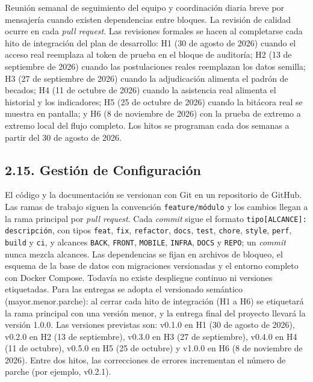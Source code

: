 Reunión semanal de seguimiento del equipo y coordinación diaria breve por mensajería cuando existen dependencias entre bloques. La revisión de calidad ocurre en cada \textit{pull request}. Las revisiones formales se hacen al completarse cada hito de integración del plan de desarrollo: H1 (30 de agosto de 2026) cuando el acceso real reemplaza al token de prueba en el bloque de auditoría; H2 (13 de septiembre de 2026) cuando las postulaciones reales reemplazan los datos semilla; H3 (27 de septiembre de 2026) cuando la adjudicación alimenta el padrón de becados; H4 (11 de octubre de 2026) cuando la asistencia real alimenta el historial y los indicadores; H5 (25 de octubre de 2026) cuando la bitácora real se muestra en pantalla; y H6 (8 de noviembre de 2026) con la prueba de extremo a extremo local del flujo completo. Los hitos se programan cada dos semanas a partir del 30 de agosto de 2026.

\subsection{2.15. Gestión de Configuración}

El código y la documentación se versionan con Git en un repositorio de GitHub. Las ramas de trabajo siguen la convención \texttt{feature/m\'odulo} y los cambios llegan a la rama principal por \textit{pull request}. Cada \textit{commit} sigue el formato \texttt{tipo[ALCANCE]: descripción}, con tipos \texttt{feat}, \texttt{fix}, \texttt{refactor}, \texttt{docs}, \texttt{test}, \texttt{chore}, \texttt{style}, \texttt{perf}, \texttt{build} y \texttt{ci}, y alcances \texttt{BACK}, \texttt{FRONT}, \texttt{MOBILE}, \texttt{INFRA}, \texttt{DOCS} y \texttt{REPO}; un \textit{commit} nunca mezcla alcances. Las dependencias se fijan en archivos de bloqueo, el esquema de la base de datos con migraciones versionadas y el entorno completo con Docker Compose. Todavía no existe despliegue continuo ni versiones etiquetadas. Para las entregas se adopta el versionado semántico (mayor.menor.parche): al cerrar cada hito de integración (H1 a H6) se etiquetará la rama principal con una versión menor, y la entrega final del proyecto llevará la versión 1.0.0. Las versiones previstas son: v0.1.0 en H1 (30 de agosto de 2026), v0.2.0 en H2 (13 de septiembre), v0.3.0 en H3 (27 de septiembre), v0.4.0 en H4 (11 de octubre), v0.5.0 en H5 (25 de octubre) y v1.0.0 en H6 (8 de noviembre de 2026). Entre dos hitos, las correcciones de errores incrementan el número de parche (por ejemplo, v0.2.1).

